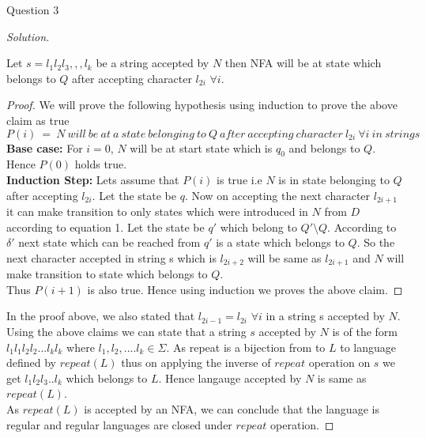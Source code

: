 \begin{solution}{Question 3}
\begin{proof}[Solution]
        \begin{claim}
            Let $s = l_1l_2l_3,,,l_k$ be a string accepted by $N$ then NFA will be at state which belongs to $Q$ after accepting character $l_{2i}$ $\forall i$.
        \end{claim}
        \begin{proof}
            We will prove the following hypothesis using induction to prove the above claim as true
            \[P(i)\ =\ N\ will\ be\ at\ a\ state\ belonging\ to\ Q\ after\ accepting\ character\ l_{2i}\ \forall i\ in\ string s\]
            \textbf{Base case:} For $i = 0$, $N$ will be at start state which is $q_0$ and belongs to $Q$. Hence $P(0)$ holds true.
            \\
            \textbf{Induction Step:} Lets assume that $P(i)$ is true i.e $N$ is in state belonging to $Q$ after accepting $l_{2i}$. Let the state be $q$. Now on accepting the next character $l_{2i+1}$ it can make transition to only states which were introduced in $N$ from $D$ according to equation 1. Let the state be $q'$ which belong to $Q'\setminus Q$. According to $\delta'$ next state which can be reached from $q'$ is a state which belongs to $Q$. So the next character accepted in string s which is $l_{2i+2}$  will be same as $l_{2i+1}$ and $N$ will make transition to state which belongs to $Q$.\\
            Thus $P(i+1)$ is also true.
            Hence using induction we proves the above claim.
        \end{proof}
        
        In the proof above, we also stated that $l_{2i-1} = l_{2i}$ $\forall i$ in a string s accepted by $N$.\\
        
        Using the above claims we can state that a string $s$ accepted by $N$ is of the form $l_1l_1l_2l_2...l_kl_k$ where $l_1, l_2,.... l_k \in \Sigma$. As repeat is a bijection from to $L$ to language defined by $repeat(L)$ thus on applying the inverse of $repeat$ operation  on $s$ we get $l_1l_2l_3..l_k$ which belongs to $L$. Hence langauge accepted by $N$ is same as $repeat(L)$.\\
        
        As $repeat(L)$ is accepted by an NFA, we can conclude that the language is regular and regular languages are closed under $repeat$ operation.
        
    \end{proof}
\end{solution}
